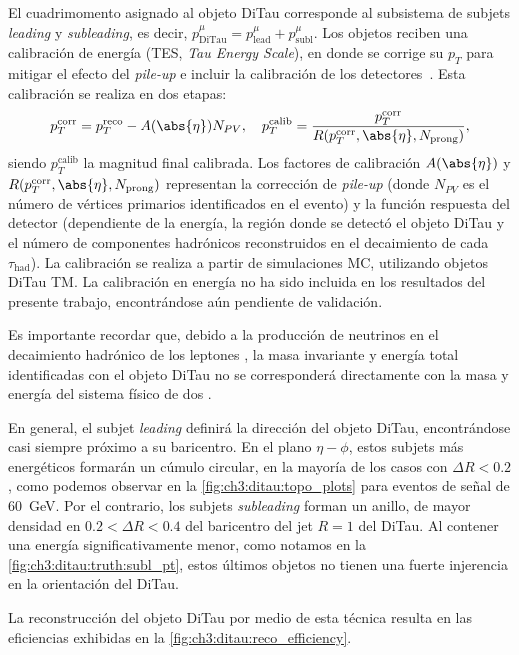 El cuadrimomento asignado al objeto DiTau corresponde al subsistema de subjets \textit{leading} y \textit{subleading}, es decir, $p^\mu_{\text{DiTau}} = p^\mu_{\text{lead}} + p^\mu_{\text{subl}}$. Los objetos reciben una calibración de energía (TES, \textit{Tau Energy Scale}), en donde se corrige su $p_T$ para mitigar el efecto del \textit{pile-up} e incluir la calibración de los detectores~. Esta calibración se realiza en dos etapas:
\begin{equation}
    p_T^{\text{corr}} = p_T^{\text{reco}} - A(\abs{\eta}) N_{PV}, \quad p_T^{\text{calib}} = \frac{p_T^{\text{corr}}}{R(p_T^{\text{corr}}, \abs{\eta}, N_{\text{prong}})}, \label{eq:ch3:ditau:energy_cal}
\end{equation}
siendo $p_T^{\text{calib}}$ la magnitud final calibrada. Los factores de calibración $A(\abs{\eta})$ y $R(p_T^{\text{corr}}, \abs{\eta}, N_{\text{prong}})$ representan la corrección de \textit{pile-up} (donde $N_{PV}$ es el número de vértices primarios identificados en el evento) y la función respuesta del detector (dependiente de la energía, la región donde se detectó el objeto DiTau y el número de componentes hadrónicos reconstruidos en el decaimiento de cada $\tau_{\text{had}}$). La calibración se realiza a partir de simulaciones MC, utilizando objetos DiTau TM. La calibración en energía no ha sido incluida en los resultados del presente trabajo, encontrándose aún pendiente de validación.

Es importante recordar que, debido a la producción de neutrinos en el decaimiento hadrónico de los leptones \ttau, la masa invariante y energía total identificadas con el objeto DiTau no se corresponderá directamente con la masa y energía del sistema físico de dos \ttaus.

En general, el subjet \textit{leading} definirá la dirección del objeto DiTau, encontrándose casi siempre próximo a su baricentro. En el plano $\eta-\phi$, estos subjets más energéticos formarán un cúmulo circular, en la mayoría de los casos con $\Delta R < 0.2$, como podemos observar en la \cref{fig:ch3:ditau:topo_plots} para eventos de señal de \SI{60}{\GeV}. Por el contrario, los subjets \textit{subleading} forman un anillo, de mayor densidad en $0.2 < \Delta R < 0.4$ del baricentro del jet $R = 1$ del DiTau. Al contener una energía significativamente menor, como notamos en la \cref{fig:ch3:ditau:truth:subl_pt}, estos últimos objetos no tienen una fuerte injerencia en la orientación del DiTau.

La reconstrucción del objeto DiTau por medio de esta técnica resulta en las eficiencias exhibidas en la \cref{fig:ch3:ditau:reco_efficiency}.


